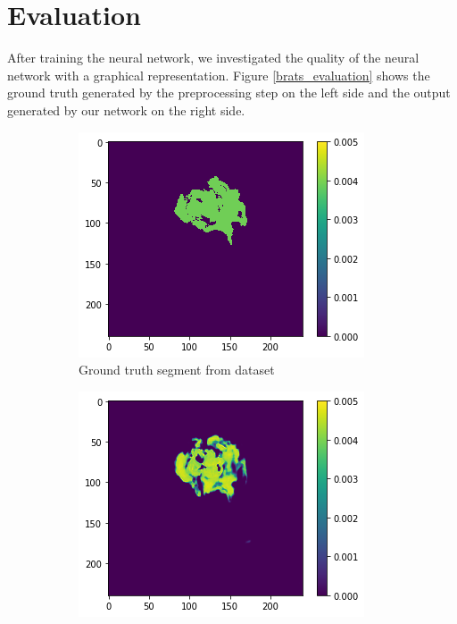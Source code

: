 \clearpage

\section{Evaluation}

After training the neural network, we investigated the quality of the neural network with a graphical representation. Figure \ref{brats_evaluation}
shows the ground truth generated by the preprocessing step on the left side and the output generated by our network on the right side.

\begin{figure}[H]
    \centering
    \begin{subfigure}[t]{.5\textwidth}
        \centering
        \includegraphics[width=\linewidth]{chapters/04_segmentation/images/evaluate1.png}
        \caption{Ground truth segment from dataset}
    \end{subfigure}%
    \begin{subfigure}[t]{.5\textwidth}
        \centering
        \includegraphics[width=\linewidth]{chapters/04_segmentation/images/evaluate2.png}

\end{subfigure}
\end{figure}
